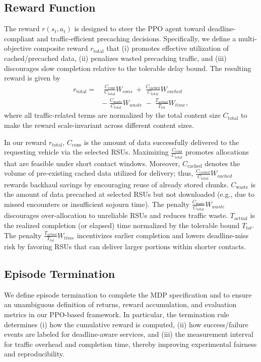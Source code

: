 \subsection{Reward Function}
\label{subsec:reward}
The reward $r(s_t,a_t)$ is designed to steer the PPO agent toward deadline-compliant and traffic-efficient precaching decisions. 
Specifically, we define a multi-objective composite reward $r_{\mathrm{total}}$ that (i) promotes effective utilization of cached/precached data, (ii) penalizes wasted precaching traffic, and (iii) discourages slow completion relative to the tolerable delay bound. 
The resulting reward is given by
\begin{align}
r_{\mathrm{total}} = & \; \frac{C_{\text{cons}}}{C_{\text{total}}} W_{cons} 
\;+\; \frac{C_{\text{cached}}}{C_{\text{total}}} W_{cached} \nonumber \\
& -\; \frac{C_{\text{waste}}}{C_{\text{total}}} W_{waste} 
\;-\; \frac{T_{\text{actual}}}{T_{tol}} W_{time},
\label{eq:reward}
\end{align}
where all traffic-related terms are normalized by the total content size $C_{\text{total}}$ to make the reward scale-invariant across different content sizes.

In our reward $r_{\mathrm{total}}$, $C_{\text{cons}}$ is the amount of data successfully delivered to the requesting vehicle via the selected RSUs. 
Maximizing $\frac{C_{\text{cons}}}{C_{\text{total}}}$ promotes allocations that are feasible under short contact windows. 
Moreover, $C_{\text{cached}}$ denotes the volume of pre-existing cached data utilized for delivery; thus, $\frac{C_{\text{cached}}}{C_{\text{total}}}W_{cached}$ rewards backhaul savings by encouraging reuse of already stored chunks.
$C_{\text{waste}}$ is the amount of data precached at selected RSUs but not downloaded (e.g., due to missed encounters or insufficient sojourn time). 
The penalty $\frac{C_{\text{waste}}}{C_{\text{total}}}W_{waste}$ discourages over-allocation to unreliable RSUs and reduces traffic waste.
$T_{\text{actual}}$ is the realized completion (or elapsed) time normalized by the tolerable bound $T_{tol}$. 
The penalty $\frac{T_{\text{actual}}}{T_{tol}}W_{time}$ incentivizes earlier completion and lowers deadline-miss risk by favoring RSUs that can deliver larger portions within shorter contacts.

\subsection{Episode Termination}
We define episode termination to complete the MDP specification and to ensure an unambiguous definition of returns, reward accumulation, and evaluation metrics in our PPO-based framework. In particular, the termination rule determines (i) how the cumulative reward is computed, (ii) how success/failure events are labeled for deadline-aware services, and (iii) the measurement interval for traffic overhead and completion time, thereby improving experimental fairness and reproducibility.

